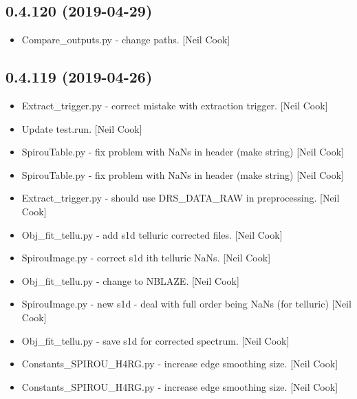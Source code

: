 \documentclass[a4paper,10pt,english]{report}
\begin{document}
\subsection{0.4.120 (2019-04-29)}
\label{\detokenize{misc/changelog:id139}}\begin{itemize}
\item {} 
Compare\_outputs.py - change paths. {[}Neil Cook{]}

\end{itemize}


\subsection{0.4.119 (2019-04-26)}
\label{\detokenize{misc/changelog:id140}}\begin{itemize}
\item {} 
Extract\_trigger.py - correct mistake with extraction trigger. {[}Neil
Cook{]}

\item {} 
Update test.run. {[}Neil Cook{]}

\item {} 
SpirouTable.py - fix problem with NaNs in header (make string) {[}Neil
Cook{]}

\item {} 
SpirouTable.py - fix problem with NaNs in header (make string) {[}Neil
Cook{]}

\item {} 
Extract\_trigger.py - should use DRS\_DATA\_RAW in preprocessing. {[}Neil
Cook{]}

\item {} 
Obj\_fit\_tellu.py - add s1d telluric corrected files. {[}Neil Cook{]}

\item {} 
SpirouImage.py - correct s1d ith telluric NaNs. {[}Neil Cook{]}

\item {} 
Obj\_fit\_tellu.py - change to NBLAZE. {[}Neil Cook{]}

\item {} 
SpirouImage.py - new s1d - deal with full order being NaNs (for
telluric) {[}Neil Cook{]}

\item {} 
Obj\_fit\_tellu.py - save s1d for corrected spectrum. {[}Neil Cook{]}

\item {} 
Constants\_SPIROU\_H4RG.py - increase edge smoothing size. {[}Neil Cook{]}

\item {} 
Constants\_SPIROU\_H4RG.py - increase edge smoothing size. {[}Neil Cook{]}


\end{itemize}
\end{document}
